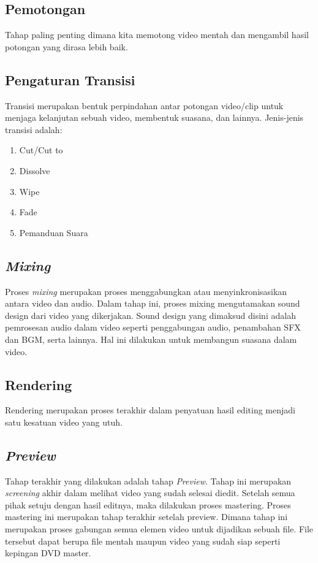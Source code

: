 \documentclass[12pt]{article}
\begin{document}
    \subsection{Pemotongan}
    Tahap paling penting dimana kita memotong video mentah dan mengambil hasil potongan yang dirasa lebih baik.

    \subsection{Pengaturan Transisi}
    Transisi merupakan bentuk perpindahan antar potongan video/clip untuk menjaga kelanjutan sebuah video, membentuk suasana, dan lainnya. Jenis-jenis transisi adalah:
    \begin{enumerate}
        \item Cut/Cut to
        \item Dissolve
        \item Wipe
        \item Fade
        \item Pemanduan Suara
    \end{enumerate}

    \subsection{\textit{Mixing}}
    Proses \textit{mixing} merupakan proses menggabungkan atau menyinkronisasikan antara video dan audio. Dalam tahap ini, proses mixing mengutamakan sound design dari video yang dikerjakan. Sound design yang dimaksud disini adalah pemrosesan audio dalam video seperti penggabungan audio, penambahan SFX dan BGM, serta lainnya. Hal ini dilakukan untuk membangun suasana dalam video.

    \subsection{Rendering}
    Rendering merupakan proses terakhir dalam penyatuan hasil editing menjadi satu kesatuan video yang utuh.

    \subsection{\textit{Preview}}
    Tahap terakhir yang dilakukan adalah tahap \textit{Preview}. Tahap ini merupakan \textit{screening} akhir dalam melihat video yang sudah selesai diedit. Setelah semua pihak setuju dengan hasil editnya, maka dilakukan proses mastering. Proses mastering ini merupakan tahap terakhir setelah preview. Dimana tahap ini merupakan proses gabungan semua elemen video untuk dijadikan sebuah file. File tersebut dapat berupa file mentah maupun video yang sudah siap seperti kepingan DVD master.
\end{document}
